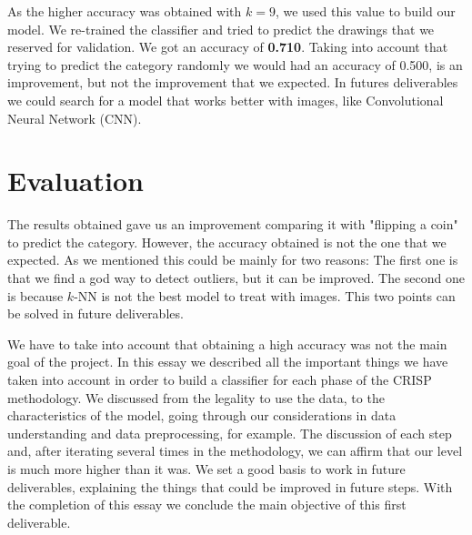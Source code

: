\documentclass{article}
\begin{document}
As the higher accuracy was obtained with $k=9$, we used this value to build our model. We re-trained the classifier and tried to predict the drawings that we reserved for validation. We got an accuracy of \textbf{0.710}. Taking into account that trying to predict the category randomly we would had an accuracy of 0.500, is an improvement, but not the improvement that we expected. In futures deliverables we could search for a model that works better with images, like Convolutional Neural Network (CNN).

\section{Evaluation}

The results obtained gave us an improvement comparing it with "flipping a coin" to predict the category. However, the accuracy obtained is not the one that we expected. As we mentioned this could be mainly for two reasons: The first one is that we find a god way to detect outliers, but it can be improved. The second one is because $k$-NN is not the best model to treat with images. This two points can be solved in future deliverables.

We have to take into account that obtaining a high accuracy was not the main goal of the project. In this essay we described all the important things we have taken into account in order to build a classifier for each phase of the CRISP methodology. We discussed from the legality to use the data, to the characteristics of the model, going through our considerations in data understanding and data preprocessing, for example. The discussion of each step and, after iterating several times in the methodology, we can affirm that our level is much more higher than it was. We set a good basis to work in future deliverables, explaining the things that could be improved in future steps. With the completion of this essay we conclude the main objective of this first deliverable.

{}

\end{document}
